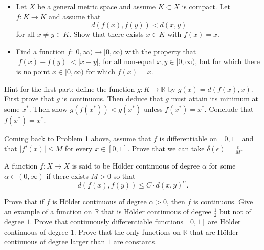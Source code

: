   \begin{exercise}
    \begin{itemize}
      \item Let $X$ be a general metric space and assume $K \subset X$ is compact. Let $f : K \to K$ and assume that
      \begin{equation}
        d(f(x), f(y)) < d(x, y)
      \end{equation}
      for all $x \neq y \in K$. Show that there exists $x \in K$ with $f(x) = x$.
      
      \item Find a function $f : [0, \infty) \to [0, \infty)$ with the property that $|f(x) - f(y)| < |x - y|$, for all non-equal $x, y \in [0, \infty)$, but for which there is no point $x \in [0, \infty)$ for which $f(x) = x$.
    \end{itemize}
    
    Hint for the first part: define the function $g : K \to \mathbb{R}$ by $g(x) = d(f(x), x)$. First prove that $g$ is continuous. Then deduce that $g$ must attain its minimum at some $x^*$. Then show $g(f(x^*)) < g(x^*)$ unless $f(x^*) = x^*$. Conclude that $f(x^*) = x^*$.
  \end{exercise}
  \begin{solution}

  \end{solution}

  \begin{exercise}
    Coming back to Problem 1 above, assume that $f$ is differentiable on $[0, 1]$ and that $|f'(x)| \leq M$ for every $x \in [0, 1]$. Prove that we can take $\delta(\epsilon) = \frac{\epsilon}{M}$.
  \end{exercise}
  \begin{solution}

  \end{solution}

  \begin{exercise}
    A function $f : X \to X$ is said to be Hölder continuous of degree $\alpha$ for some $\alpha \in (0, \infty)$ if there exists $M > 0$ so that
    \begin{equation}
      d(f(x), f(y)) \leq C \cdot d(x, y)^{\alpha}.
    \end{equation}
    
    Prove that if $f$ is Hölder continuous of degree $\alpha > 0$, then $f$ is continuous. Give an example of a function on $\mathbb{R}$ that is Hölder continuous of degree $\frac{1}{2}$ but not of degree $1$. Prove that continuously differentiable functions $[0,1]$ are Hölder continuous of degree $1$. Prove that the only functions on $\mathbb{R}$ that are Hölder continuous of degree larger than $1$ are constants.
  \end{exercise}
  \begin{solution}

  \end{solution}

